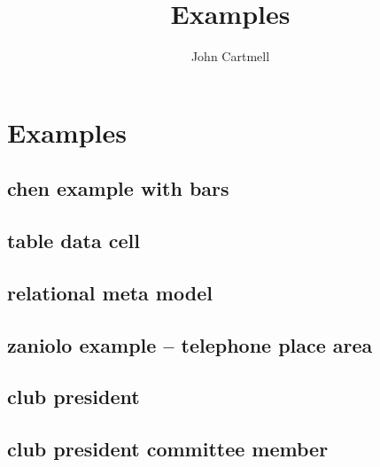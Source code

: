 \documentclass[10pt,a4paper]{article}
\begin{document}
\title{Examples}


\author{John Cartmell}
\iffalse
\maketitle
\begin{center}
DRAFT
\end{center}
\fi
\appendix
\section{Examples}

\iffalse
\subsection{chen example sans bars}

\fi

\iffalse
\subsection{chen example with bars}


\subsection{table data cell}


\subsection{relational meta model}




\subsection{zaniolo example -- telephone place area}


\subsection{club president}


\subsection{club president committee member}

\end{document}
